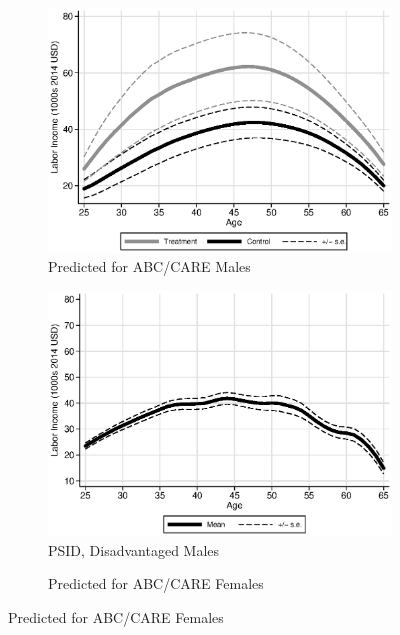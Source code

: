 \begin{figure}
\centering
\caption{Labor Income Profiles, Prediction Based on $\bm{X}_{t}$}\label{fig:labor-income-profiles}
\begin{subfigure}[h]{0.4\textwidth}
		\centering
		\caption{Predicted for ABC/CARE Males} \label{fig:abcare1}
		\includegraphics[width=\textwidth]{output/labor_25-60_male_5.eps}
\end{subfigure}%
\begin{subfigure}[h]{0.4\textwidth}
	\centering
	\caption{PSID, Disadvantaged Males} \label{fig:psid1}
		\includegraphics[width=\textwidth]{output/psid_incomeprofiles_s1.eps}
\end{subfigure}
\begin{subfigure}[h]{0.4\textwidth}
		\centering
		\caption{Predicted for ABC/CARE Females} \label{fig:abcare0}

\end{subfigure}
\end{figure}

